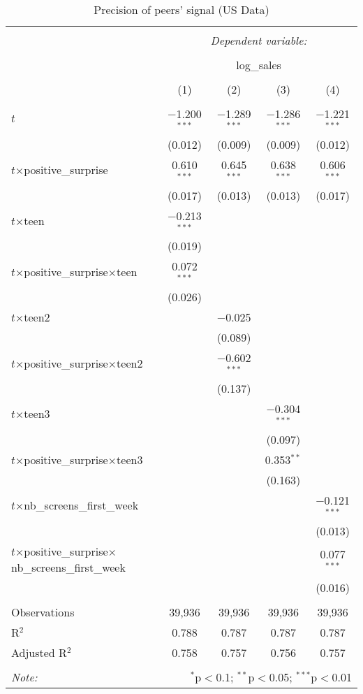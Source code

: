 \begin{table}[!htbp] \centering 
	\caption{Precision of peers' signal (US Data)} 
  \label{uspred3} 
\begin{tabular}{@{\extracolsep{0pt}}lcccc} 
\\[-1.8ex]\hline 
\hline \\[-1.8ex] 
 & \multicolumn{4}{c}{\textit{Dependent variable:}} \\ 
\cline{2-5} 
\\[-1.8ex] & \multicolumn{4}{c}{log\_sales} \\ 
\\[-1.8ex] & (1) & (2) & (3) & (4)\\ 
\hline \\[-1.8ex] 
 $t$ & $-$1.200$^{***}$ & $-$1.289$^{***}$ & $-$1.286$^{***}$ & $-$1.221$^{***}$ \\ 
  & (0.012) & (0.009) & (0.009) & (0.012) \\ 
 $t$$\times$positive\_surprise & 0.610$^{***}$ & 0.645$^{***}$ & 0.638$^{***}$ & 0.606$^{***}$ \\ 
  & (0.017) & (0.013) & (0.013) & (0.017) \\ 
 $t$$\times$teen & $-$0.213$^{***}$ &  &  &  \\ 
  & (0.019) &  &  &  \\ 
 $t$$\times$positive\_surprise$\times$teen & 0.072$^{***}$ &  &  &  \\ 
  & (0.026) &  &  &  \\ 
 $t$$\times$teen2 &  & $-$0.025 &  &  \\ 
  &  & (0.089) &  &  \\ 
 $t$$\times$positive\_surprise$\times$teen2 &  & $-$0.602$^{***}$ &  &  \\ 
  &  & (0.137) &  &  \\ 
 $t$$\times$teen3 &  &  & $-$0.304$^{***}$ &  \\ 
  &  &  & (0.097) &  \\ 
 $t$$\times$positive\_surprise$\times$teen3 &  &  & 0.353$^{**}$ &  \\ 
  &  &  & (0.163) &  \\ 
 $t$$\times$nb\_screens\_first\_week &  &  &  & $-$0.121$^{***}$ \\ 
  &  &  &  & (0.013) \\ 
 $t$$\times$positive\_surprise$\times$nb\_screens\_first\_week &  &  &  & 0.077$^{***}$ \\ 
  &  &  &  & (0.016) \\ 
\hline \\[-1.8ex] 
Observations & 39,936 & 39,936 & 39,936 & 39,936 \\ 
R$^{2}$ & 0.788 & 0.787 & 0.787 & 0.787 \\ 
Adjusted R$^{2}$ & 0.758 & 0.757 & 0.756 & 0.757 \\ 
\hline 
\hline \\[-1.8ex] 
\textit{Note:}  & \multicolumn{4}{r}{$^{*}$p$<$0.1; $^{**}$p$<$0.05; $^{***}$p$<$0.01} \\ 
\end{tabular} 
\end{table} 
